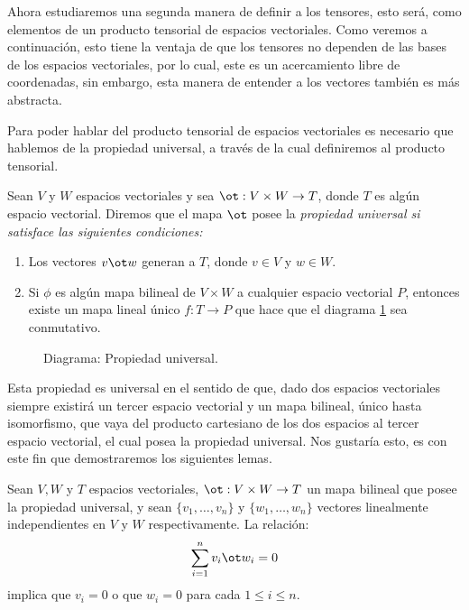Ahora estudiaremos una segunda manera de definir a los tensores, esto será,
como elementos de un producto tensorial de espacios vectoriales. Como veremos
a continuación, esto tiene la ventaja de que los tensores no dependen de las
bases de los espacios vectoriales, por lo cual, este es un acercamiento libre
de coordenadas, sin embargo, esta manera de entender a los vectores también es
más abstracta.

Para poder hablar del producto tensorial de espacios vectoriales es necesario
que hablemos de la propiedad universal, a través de la cual definiremos al
producto tensorial.

\begin{definition}
	Sean $V$ y $W$ espacios vectoriales y sea $\ot: V \times W \to T$, donde
	$T$ es algún espacio vectorial. Diremos que el mapa $\ot$ posee la
	\it{propiedad universal} si satisface las siguientes condiciones:
	\begin{enumerate}
		\item Los vectores $v \ot w$ generan a $T$, donde $v \in V$ y
		      $w \in W$.
		\item Si $\phi$ es algún mapa bilineal de $V \times W$ a cualquier espacio
		      vectorial $P$, entonces existe un mapa lineal único $f: T \to P$ que
		      hace que el diagrama \ref{Diagrama de la propiedad universal} sea
		      conmutativo.
	\end{enumerate}
\end{definition}

\begin{figure}[h]
	\center
	
	\caption{Diagrama: Propiedad universal.}
	\label{Diagrama de la propiedad universal}
\end{figure}

Esta propiedad es universal en el sentido de que, dado dos espacios vectoriales
siempre existirá un tercer espacio vectorial y un mapa bilineal, único hasta
isomorfismo, que vaya del producto cartesiano de los dos espacios al tercer
espacio vectorial, el cual posea la propiedad universal. Nos gustaría esto, es
con este fin que demostraremos los siguientes lemas.

\begin{lemma}
	Sean $V, W$ y $T$ espacios vectoriales, $\ot: V \times W \to T$ un mapa
	bilineal que posee la propiedad universal, y sean $\{v_1,\ldots,v_n\}$ y
	$\{w_1,\ldots,w_n\}$ vectores linealmente independientes en $V$ y $W$
	respectivamente. La relación:
	\[
		\sum_{i=1}^{n} v_i \ot w_i = 0
	\]
	implica que $v_i = 0$ o que $w_i = 0$ para cada $1 \leq i \leq n$.
\end{lemma}

